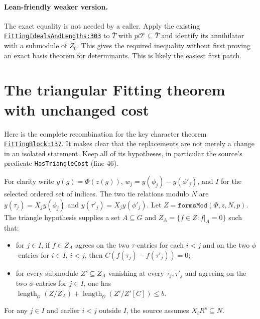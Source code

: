 \documentclass[11pt]{article}
\theoremstyle{remark}\newtheorem{remark}[theorem]{Remark}
\newcommand{\Ocal}{\mathcal O}
\newcommand{\len}{\operatorname{length}_{\Ocal}}
\newcommand{\src}[2]{\href{https://github.com/VladimirReshetnikov/ProveIt/blob/9050b04000647d588d0c78d945180abcd3b0bcf7/Analysis/GeneralizedRiemannHypothesis/Lean/grh/src/#1}{\texttt{#2}}}
\begin{document}
\paragraph{Lean-friendly weaker version.} The exact equality is not needed by a caller. Apply the existing \src{Lib/General/Algebra/FittingIdealsAndLengths.lean\#L303}{FittingIdealsAndLengths:303} to $\bar T$ with $p\Ocal^s\subseteq\bar T$ and identify its annihilator with a submodule of $Z_0$. This gives the required inequality without first proving an exact basis theorem for determinants. This is likely the easiest first patch.

\section{The triangular Fitting theorem with unchanged cost}
Here is the complete recombination for the key character theorem \src{New/Congruences/FirstOrder/FittingBlock.lean\#L137}{FittingBlock:137}. It makes clear that the replacements are not merely a change in an isolated statement. Keep all of its hypotheses, in particular the source's predicate \texttt{HasTriangleCost} (line 46).

For clarity write $y(g)=\Phi(z(g))$, $w_j=y(\phi_j)-y(\phi'_j)$, and $I$ for the selected ordered set of indices. The two tie relations modulo $N$ are $y(\tau_j)=X_j y(\phi_j)$ and $y(\tau'_j)=X_j y(\phi'_j)$. Let $Z=\texttt{formsMod}(\Phi,z,N,p)$. The triangle hypothesis supplies a set $A\subseteq G$ and $Z_A=\{f\in Z:f|_A=0\}$ such that:
\begin{itemize}
\item for $j\in I$, if $f\in Z_A$ agrees on the two $\tau$-entries for each $i<j$ and on the two $\phi$-entries for $i\in I$, $i<j$, then $C(f(\tau_j)-f(\tau'_j))=0$;
\item for every submodule $Z'\subseteq Z_A$ vanishing at every $\tau_j,\tau'_j$ and agreeing on the two $\phi$-entries for $j\in I$, one has $\len(Z/Z_A)+\len(Z'/Z'[C])\le b$.
\end{itemize}
For any $j\in I$ and earlier $i<j$ outside $I$, the source assumes $X_iR^s\subseteq N$.
\end{document}
